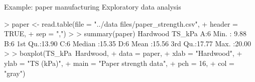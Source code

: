 \documentclass[t]{beamer}
\begin{document}

\begin{ftstf}
{Example: paper manufacturing}
{Exploratory data analysis}
\begin{rcode}
> paper   <- read.table(file = "../data files/paper_strength.csv", 
+                       header = TRUE, 
+                       sep = ",")
>
> summary(paper)
 Hardwood     TS_kPa     
 A:6      Min.   : 9.88  
 B:6      1st Qu.:13.90  
 C:6      Median :15.35  
 D:6      Mean   :15.56  
          3rd Qu.:17.77  
          Max.   :20.00  
> 
> boxplot(TS_kPa~Hardwood, 
+         data = paper, 
+         xlab = "Hardwood",
+         ylab = "TS (kPa)", 
+         main = "Paper strength data",
+         pch  = 16,
+         col  = "gray")
\end{rcode}
\end{ftstf}

\end{document}
